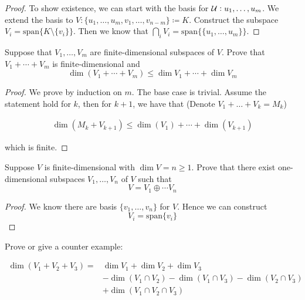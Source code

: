 \documentclass{extarticle}
\begin{document}
\begin{proof}
    To show existence, we can start with the basis for \(\mathcal{U}: u_1, \ldots, u_m\). 
    We extend the basis to \(V: \{ u_1, \ldots, u_m, v_1, \ldots, v_{n-m}\} \coloneqq K\). Construct 
    the subspace \(V_i = \text{span}\{K \setminus \{v_i\}\}\). Then we know that 
    \(\bigcap_i V_i = \text{span}\{\{u_1, \ldots, u_m\}\}\). 
\end{proof}

\begin{problem}{17}
    Suppose that \(V_1, \ldots, V_m\) are finite-dimensional subspaces of \(V\). Prove that 
    \(V_1 + \cdots + V_m\) is finite-dimensional and 
    \[\dim(V_1 + \cdots + V_m) \leq \dim V_1 + \cdots + \dim V_m\]
\end{problem}

\begin{proof}
We prove by induction on \(m\). The base case is trivial. Assume the statement hold for \(k\),
then for \(k+1\), we have that (Denote \(V_1 + \ldots + V_k = M_k\))

\begin{align*}
    \dim(M_k + V_{k+1}) \leq \dim(V_1) + \cdots +\dim (V_{k+1}) 
\end{align*}

which is finite.
\end{proof}

\begin{problem}{18}
    Suppose \(V\) is finite-dimensional with \(\dim V = n \geq 1\). Prove that there exist 
    one-dimensional subspaces \(V_1, \ldots, V_n\) of \(V\) such that 
    \[V = V_1 \oplus \cdots V_n\]
\end{problem}

\begin{proof}
We know there are basis \(\{v_1, \ldots, v_n\}\) for \(V\). Hence we can construct 
\[V_i = \text{span}\{v_i\}\]
\end{proof}

\begin{problem}{19}
    Prove or give a counter example:

    \begin{align*}
        \dim(V_1 + V_2 + V_3) = &\dim V_1 + \dim V_2 + \dim V_3\\ 
        &-\dim(V_1 \cap V_2) - \dim (V_1 \cap V_3) - \dim (V_2 \cap V_3) \\ 
        &+\dim(V_1 \cap V_2 \cap V_3)
    \end{align*}
\end{problem}
\end{document}
